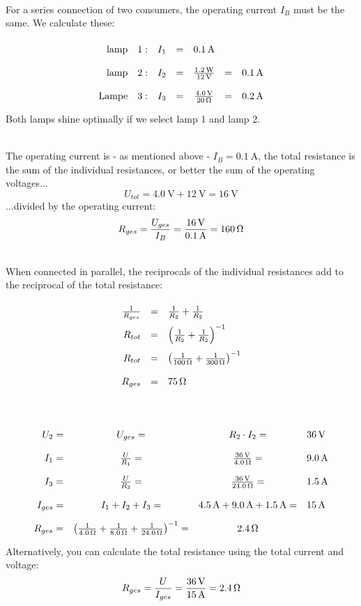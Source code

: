 \documentclass[a4paper]{article}
\begin{document}
	\\
	For a series connection of two consumers, the operating current $I_B$ must be the same.
	We calculate these:
	$$
	\renewcommand{\arraystretch}{2}
	\begin{array}{rcccl}
		{\rm lamp \quad 1:} \quad I_1 &=& \SI{0,1}{\ampere}\\
		{\rm lamp \quad 2:} \quad I_2 &=& { \SI{1,2}{\watt} \over \SI{12}{\volt}} &=& \SI{0,1}{ \ampere}\\
		{\rm Lampe \quad 3:} \quad I_3 &=& { \SI{4,0}{\volt} \over \SI{20}{\ohm}} &=& \SI{0,2}{\ampere} \\
		\end{array}
		$$
		Both lamps shine optimally if we select lamp 1 and lamp 2.
		\vspace{0.5 cm}
		
		\\
		The operating current is - as mentioned above - $I_B=\SI{0.1}{\ampere}$, the total resistance is
		the sum of the individual resistances, or better the sum of the operating voltages...
		$$U_{tot}=\SI{4,0}{\volt} + \SI{12}{\volt} = \SI{16}{\volt}$$
		...divided by the operating current:
		$$R_{ges}={ U_{ges} \over I_B}={\SI{16}{\volt}\over \SI{0,1}{\ampere}}= \SI{160}{\ohm } $$
		\vspace{0.5 cm}
		
		\\
		When connected in parallel, the reciprocals of the individual resistances add to the reciprocal of the total resistance:
		$$
		\renewcommand{\arraystretch}{2}
		\begin{array}{rcl}
		{1 \over R_{ges}} &=& {1 \over R_2} + {1 \over R_2}\\
		R_{tot} &=& \left({1 \over R_2} + {1 \over R_2} \right)^{-1}\\
		R_{tot} &=& \left({1 \over \SI{100}{\ohm}} + {1 \over \SI{300}{\ohm}} \right)^{-1}\\
		R_{ges} &=& \SI{75}{\ohm}
		\end{array}
		$$
		\vspace{0.5 cm}
		
		\\
		$$
		\renewcommand{\arraystretch}{2}
		\begin{array}{rccl}
		U_2 =& U_{ges}=& R_2 \cdot I_2 =& \SI{36}{\volt} \\
		I_1 =& {U \over R_1} =& { \SI{36}{\volt} \over \SI{4.0}{\ohm}}=& \SI{9.0}{\ampere} \\
		I_3 =& {U \over R_3} =& { \SI{36}{\volt} \over \SI{24.0}{\ohm}}=& \SI{1.5}{\ampere} \\
		I_{ges}=& I_1 +I_2+ I_3 =& \SI{4.5}{\ampere} + \SI{9.0}{\ampere} + \SI{1.5}{\ampere} =& \SI{15}{\ampere}\\
		R_{ges}=& \left({1 \over \SI{4,0}{\ohm}} + {1 \over \SI{8,0}{\ohm}} + {1 \over \SI{ 24.0}{\ohm}}\right)^{-1}
		=& \SI{2,4}{\ohm} \\
		\end{array}
		$$
		Alternatively, you can calculate the total resistance using the total current and voltage:
		$$R_{ges}={U \over I_{ges}}={\SI{36}{\volt} \over \SI{15}{\ampere}}= \SI{2,4}{\ohm }$$
		
\end{document}
